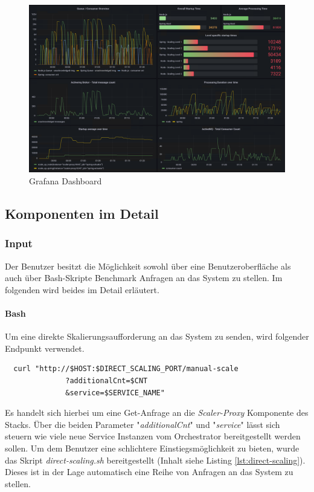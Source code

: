 \begin{figure}
	\centering
	\includegraphics[width=\linewidth]{kapitel/problemloesung/implementierung/_img/grafana-dashboard-01}
	\caption[]{Grafana Dashboard}
	\label{fig:grafanaOverview}
\end{figure}


\subsection{Komponenten im Detail}

\subsubsection{Input}
Der Benutzer besitzt die Möglichkeit sowohl über eine Benutzeroberfläche als auch über Bash-Skripte Benchmark Anfragen an das System zu stellen. Im folgenden wird beides im Detail erläutert.

\paragraph{Bash}
Um eine direkte Skalierungsaufforderung an das System zu senden, wird folgender Endpunkt verwendet.
\begin{verbatim}
  curl "http://$HOST:$DIRECT_SCALING_PORT/manual-scale
              ?additionalCnt=$CNT
              &service=$SERVICE_NAME"
\end{verbatim}

Es handelt sich hierbei um eine Get-Anfrage an die \emph{Scaler-Proxy} Komponente des Stacks. Über die beiden Parameter "\emph{additionalCnt}" und "\emph{service}" lässt sich steuern wie viele neue Service Instanzen vom Orchestrator bereitgestellt werden sollen. Um dem Benutzer eine schlichtere Einstiegsmöglichkeit zu bieten, wurde das Skript \emph{direct-scaling.sh} bereitgestellt (Inhalt siehe Listing \ref{lst:direct-scaling}). Dieses ist in der Lage automatisch eine Reihe von Anfragen an das System zu stellen. 

